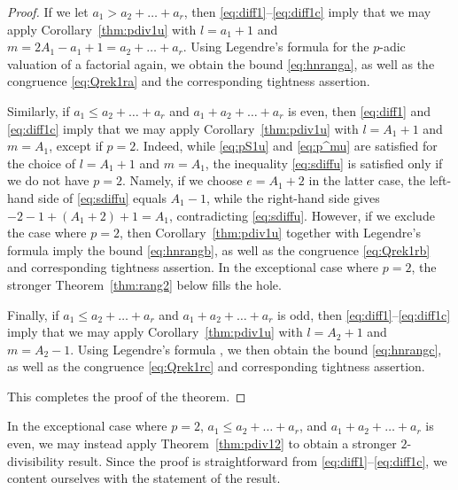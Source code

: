 \documentclass[12pt,reqno]{amsart}
\numberwithin{equation}{section}
\theoremstyle{remark}
\begin{document}
\begin{proof}
If we let $a_1> a_2+\dots+a_r$, then \eqref{eq:diff1}--\eqref{eq:diff1c}
imply that we may apply 
Corollary~\ref{thm:pdiv1u} with $l=a_1+1$ and $m=2A_1-a_1+1=a_2+\dots+a_r$.
Using Legendre's formula \cite[p.~10]{LegeAA} for the $p$-adic
valuation of a factorial again, we obtain
the bound \eqref{eq:hnranga}, as well as the congruence
\eqref{eq:Qrek1ra} and the corresponding tightness assertion.

Similarly, 
if $a_1\le a_2+\dots+a_r$ and $a_1+a_2+\dots+a_r$ is even, 
then \eqref{eq:diff1} and \eqref{eq:diff1c} imply that
we may apply Corollary~\ref{thm:pdiv1u} with
$l=A_1+1$ and $m=A_1$,
except if $p=2$. Indeed, while \eqref{eq:pS1u} and \eqref{eq:p^mu}
are satisfied for the choice of $l=A_1+1$ and $m=A_1$,
the inequality \eqref{eq:sdiffu} is satisfied only if we do not
have $p=2$. Namely, if we choose $e=A_1+2$ in the latter case,
the left-hand side of \eqref{eq:sdiffu} equals $A_1-1$,
while the right-hand
side gives $-2-1+(A_1+2)+1=A_1$, contradicting \eqref{eq:sdiffu}. 
However, if we exclude the case where $p=2$, then
Corollary~\ref{thm:pdiv1u} 
together with Legendre's formula \cite[p.~10]{LegeAA} imply
the bound \eqref{eq:hnrangb}, 
as well as the congruence \eqref{eq:Qrek1rb} and
corresponding tightness assertion.
In the exceptional case where $p=2$, the stronger
Theorem~\ref{thm:rang2} below fills the hole.

Finally, if $a_1\le a_2+\dots+a_r$ and $a_1+a_2+\dots+a_r$ is odd, 
then \eqref{eq:diff1}--\eqref{eq:diff1c} imply that
we may apply Corollary~\ref{thm:pdiv1u} with 
$l=A_2+1$ and $m=A_2-1$.
Using Legendre's formula \cite[p.~10]{LegeAA}, 
we then obtain the bound \eqref{eq:hnrangc},
as well as the congruence \eqref{eq:Qrek1rc} and
corresponding tightness assertion.

This completes the proof of the theorem.
\end{proof}

In the exceptional case where $p=2$, $a_1\le a_2+\dots+a_r$, 
and $a_1+a_2+\dots+a_r$ is
even, we may instead apply Theorem~\ref{thm:pdiv12} to obtain
a stronger $2$-divisibility result. Since the proof is
straightforward from \eqref{eq:diff1}--\eqref{eq:diff1c}, 
we content ourselves with the statement of the result.
\end{document}
